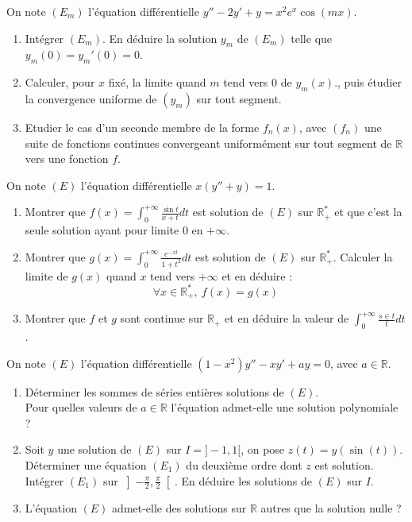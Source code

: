 \documentclass[french,a4paper]{article}
\newcommand{\R}{\mathbb{R}}
\newcommand{\st}{^*}
\theoremstyle{plain}
\theoremstyle{definition}
\theoremstyle{remark}
\begin{document}
\begin{ex}[Moulin.14]{}
	On note $(E_m)$ l'équation différentielle $y''-2y'+y=x^2e^x\cos(mx)$.
	\begin{enumerate}
		\item Intégrer $(E_m)$. En déduire la solution $y_m$ de $(E_m)$ telle que $y_m(0)=y_m'(0)=0$.
		\item Calculer, pour $x$ fixé, la limite quand $m$ tend vers $0$ de $y_m(x)$., puis étudier la convergence uniforme de $(y_m)$ sur tout segment.
		\item Etudier le cas d'un seconde membre de la forme $f_n(x)$, avec $(f_n)$ une suite de fonctions continues convergeant uniformément sur tout segment de $\R$ vers une fonction $f$.
	\end{enumerate}
\end{ex}

\begin{ex}[Moulin.15]{}
	On note $(E)$ l'équation différentielle $x(y''+y)=1$.
	\begin{enumerate}
		\item Montrer que $f(x)=\displaystyle\int_{0}^{+\infty}\frac{\sin t}{x+t}dt$ est solution de $(E)$ sur $\R_+\st$ et que c'est la seule solution ayant pour limite $0$ en $+\infty$.
		\item Montrer que $g(x)=\displaystyle\int_{0}^{+\infty}\frac{e^{-xt}}{1+t^2}dt$ est solution de $(E)$ sur $\R_+\st$. Calculer la limite de $g(x)$ quand $x$ tend vers $+\infty$ et en déduire : $$\forall x\in\R_+\st,\ f(x)=g(x)$$
		\item Montrer que $f$ et $g$ sont continue sur $\R_+$ et en déduire la valeur de $\displaystyle\int_{0}^{+\infty}\frac{s\in t}{t}dt$.
	\end{enumerate}
\end{ex}

\begin{ex}[Moulin.16]{}
	On note $(E)$ l'équation différentielle $(1-x^2)y''-xy'+ay=0$, avec $a\in\R$.
	\begin{enumerate}
		\item Déterminer les sommes de séries entières solutions de $(E)$. \\ Pour quelles valeurs de $a\in\R$ l'équation admet-elle une solution polynomiale ?
		\item Soit $y$ une solution de $(E)$ sur $I=]-1,1[$, on pose $z(t)=y(\sin(t))$. \\ Déterminer une équation $(E_1)$ du deuxième ordre dont $z$ est solution. Intégrer $(E_1)$ sur $\displaystyle\left]-\frac{\pi}{2},\frac{\pi}{2}\right[$. En déduire les solutions de $(E)$ sur $I$.
		\item L'équation $(E)$ admet-elle des solutions sur $\R$ autres que la solution nulle ?
	\end{enumerate}
\end{ex}
\end{document}
